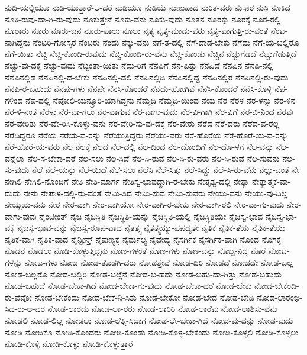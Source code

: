 {ನುಡಿ-ಯಲ್ಲಿಯೂ
ನುಡಿ-ಯುತ್ತಾರೆ-ಆ-ದರೆ
ನುಡಿಯೂ
ನುಡಿಯೆ
ನುಣುಪಾದ
ನುರಿತ-ವರು
ನುಸಾರ
ನುಸಿ
ನೂಕಿದ
ನೂಕಿ-ರುವು-ದಾ-ಗಿ-ರು-ವುದು
ನೂಕುತ್ತೇನೆ
ನೂಕು-ವನು
ನೂಕು-ವುದು
ನೂತನ
ನೂರಕ್ಕು
ನೂರಕ್ಕೆ
ನೂರ-ರಲ್ಲಿ
ನೂರಾರು
ನೂರು
ನೂರು-ಜನ
ನೂರು-ಪಾಲು
ನೂಲು
ನೃತ್ಯ
ನೃತ್ಯ-ಮಾಡು-ವರು
ನೃತ್ಯ-ವಾಗುತ್ತಿ-ರು-ವಂತೆ
ನೆಂಟ-ನಾಗಿದ್ದನು
ನೆಂಟರಿ-ಗೋಸ್ಕರ
ನೆಂಟರು
ನೆಂದು
ನೆಕ್ಕು-ವನು
ನೆಗೆ-ತ-ದಲ್ಲಿ
ನೆಗೆ-ದಾಡ-ಬೇಕು
ನೆಗೆದು
ನೆಗೆ-ಯ-ಬಲ್ಲಿರೊ
ನೆಗೆ-ಯಿತು
ನೆಚ್ಚಿ
ನೆಚ್ಚಿ-ಕೊಂಡಿ-ರುವುದು
ನೆಚ್ಚಿ-ಕೊಂಡಿ-ರು-ವೆನು
ನೆಚ್ಚಿ-ಕೊಂಡು
ನೆಚ್ಚಿನ
ನೆಚ್ಚುಗೆಡದೆ
ನೆಚ್ಚುಗೆಡುತ್ತಿದೆ
ನೆಚ್ಚು-ವು-ದಕ್ಕೆ
ನೆಚ್ಚು-ವುದು
ನೆಟ್ಟಂತಾ-ಯಿತು
ನೆದು-ರಿಗೆ
ನೆನಪಿಗೆ
ನೆನ-ಪಿತ್ತು
ನೆನಪಿದೆ
ನೆನಪಿನ
ನೆನಪಿ-ನಲ್ಲಿ
ನೆನಪಿನಲ್ಲಿಡ
ನೆನಪಿನಲ್ಲಿ-ಡ-ಬೇಕು
ನೆನಪಿನಲ್ಲಿ-ಡಲಿ
ನೆನಪಿನಲ್ಲಿಡಿ
ನೆನಪಿನಲ್ಲಿದ್ದ
ನೆನಪಿನಲ್ಲಿರ
ನೆನಪಿನಲ್ಲಿ-ರು-ವುದು
ನೆನಪಿ-ರ-ಬಹುದು
ನೆನಪು-ಗಳು
ನೆನಪೇ
ನೆನಸಿ-ಕೊಂಡರೆ
ನೆನೆದು-ಹೋಗಿವೆ
ನೆನೆಸಿ-ಕೊಂಡರೆ
ನೆನೆಸಿ-ಕೊಳ್ಳಿ
ನೆಪ-ಗಳಿಂದ
ನೆಪ-ದಲ್ಲಿ
ನೆಪೋಲಿ-ಯನ್ಕ್ರೂರಿ-ಯಾಗಿದ್ದನು
ನೆಮ್ಮದಿ
ನೆಮ್ಮದಿ-ಯಿಂದ
ನೆಯ
ನೆರ
ನೆರಳ
ನೆರ-ಳನ್ನು
ನೆರ-ಳಿನ
ನೆರ-ಳಿ-ನಂತೆ
ನೆರಳು
ನೆರ-ವಾ-ಗಲು
ನೆರ-ವಾಗುವ
ನೆರ-ವಾಗು-ವುದು
ನೆರ-ವಿ-ಗಾಗಿ
ನೆರ-ವಿಗೆ
ನೆರ-ವಿ-ನಿಂದ
ನೆರವು
ನೆರ-ವೇರಿತು
ನೆರ-ವೇ-ರಿಸಿ-ಕೊಳ್ಳು-ವನು
ನೆರ-ವೇರಿ-ಸು-ವು-ದಕ್ಕೆ
ನೆರ-ವೇರು
ನೆರೆದ
ನೆರೆ-ದರು
ನೆರೆದ-ವ-ರೆಲ್ಲ
ನೆರೆದಿದ್ದರೂ
ನೆರೆಯ
ನೆರೆಯ-ವ-ರನ್ನು
ನೆರೆಯುತ್ತಿದ್ದರು
ನೆರೆಯು-ವರು
ನೆರೆ-ಹೊರೆಯ
ನೆರೆ-ಹೊರೆ-ಯ-ವ-ರನ್ನು
ನೆರೆ-ಹೊರೆ-ಯ-ವರು
ನೆಲ
ನೆಲಕ್ಕೆ
ನೆಲದ
ನೆಲ-ದಲ್ಲಿ
ನೆಲ-ದಿಂದ
ನೆಲ-ದೊಂದಿಗೆ
ನೆಲ-ದೊ-ಳಗೆ
ನೆಲ-ವನ್ನು
ನೆಲ-ವನ್ನೆಲ್ಲಾ
ನೆಲ-ಸ-ಬೇಕಾ-ದರೆ
ನೆಲ-ಸಲು
ನೆಲ-ಸಿದೆ
ನೆಲ-ಸಿ-ರುವ
ನೆಲ-ಸಿ-ರು-ವರು
ನೆಲ-ಸಿ-ರುವೆ
ನೆಲ-ಸುವನು
ನೆಲ-ಸು-ವುದು
ನೆಲೆ
ನೆಲೆ-ಯನ್ನು
ನೆಲೆ-ಯಿದೆ
ನೆಲೆ-ಸಲು
ನೆಲೆಸಿ
ನೆಲೆ-ಸಿತ್ತು
ನೆಲೆ-ಸಿದ್ದು
ನೆಲೆ-ಸಿ-ರು-ವೆನು
ನೆಲ್ಸು-ವಂತೆ
ನೇ
ನೇಗಿಲಿ
ನೇಗಿಲಿ-ನೊಂದಿಗೆ
ನೇತಿ
ನೇತಿ-ಮಾರ್ಗ
ನೇತಿಸ್ವ-ಭಾವದ್ದಾಗಿ-ರ-ಬೇಕು
ನೇತೃತ್ವ-ದಲ್ಲಿ
ನೇತ್ಯಾ
ನೇತ್ಯಾತ್ಮಕ-ವಾ-ದುದು
ನೇನು
ನೇಪಾಳ-ದಲ್ಲಿ-ರು-ವಂತೆ
ನೇಮಿ-ಸಿದ
ನೇಮಿ-ಸುವ
ನೇಮಿ-ಸುವರು
ನೇಯು-ವನು
ನೇಯು-ವು-ದಿಲ್ಲ
ನೇಯ್ಗೆಯ-ವನು
ನೇರ
ನೇರ-ವಾಗಿ
ನೇರ-ವಾಗಿಯೋ
ನೇರ-ವಾಗಿ-ರ-ಬೇಕು
ನೇರ-ವಾಗಿ-ರಲಿ
ನೇರ-ವಾ-ಗು-ವುದು
ನೇರ-ವಾಗು-ವುವು
ನೈಂಟೀಂತ್
ನೈಜ
ನೈಜಸ್ಥಿತಿ
ನೈಜಸ್ಥಿತಿ-ಯನ್ನು
ನೈಜಸ್ಥಿತಿ-ಯಲ್ಲಿ
ನೈಜಸ್ಥಿತಿಯೇ
ನೈಜಸ್ವ-ಭಾವ
ನೈಜಸ್ವ-ಭಾ-ವಕ್ಕೆ
ನೈಜಸ್ವ-ಭಾವ-ವನ್ನು
ನೈಜಸ್ವ-ರೂಪ-ವಾದ
ನೈತತ್ತ್ವ
ನೈತತ್ತ್ವಯ್ಯು-ಪಪದ್ಯತೇ
ನೈತಿಕ
ನೈತಿಕ-ತೆಯ
ನೈತಿಕ-ತೆಯು
ನೈತಿಕ-ವಾಗಿ
ನೈತಿಕ-ವಾದ
ನೈನ್ಟೀನ್ತ್
ನೈಪುಣ್ಯಕ್ಕೆ
ನೈರ್ಮಲ್ಯ
ನೈವೇದ್ಯ
ನೈಸರ್ಗಿಕ
ನೈಸರ್ಗಿಕ-ವಾಗಿ
ನೊಂದ
ನೊಗಕ್ಕೆ
ನೊಡನೆ
ನೊಡಲು
ನೊಡಿ-ಕೊಳ್ಳುತ್ತಿದ್ದನು
ನೊಣ-ಗಳಂತೆ
ನೊಣ-ಗಳು
ನೊಣ-ವನ್ನು
ನೊಬ್ಬ-ನಿದ್ದ
ನೊರೆ
ನೋಟ-ಗಳನ್ನು
ನೋಟ-ಗಳು
ನೋಡ
ನೋಡ-ತೊಡಗಿ-ದರು
ನೋಡತ್ತೇವೆ
ನೋಡ-ದಿರಿ
ನೋಡದೆ
ನೋಡದೇ
ನೋಡ-ಬಲ್ಲ
ನೋಡ-ಬಲ್ಲರೊ
ನೋಡ-ಬಲ್ಲಿರಿ
ನೋಡ-ಬಲ್ಲೆನೆ
ನೋಡ-ಬ-ಹದು
ನೋಡ-ಬಹು-ದಾ-ಗಿತ್ತು
ನೋಡ-ಬಹುದು
ನೋಡ-ಬಹುದೆ
ನೋಡ-ಬೇಕಾ-ಗಿದೆ
ನೋಡ-ಬೇಕಾ-ಗು-ವುದು
ನೋಡ-ಬೇಕಾ-ದರೆ
ನೋಡ-ಬೇಕು
ನೋಡ-ಬೇಕೆಂದಿ-ರು-ವೆವೋ
ನೋಡ-ಬೇಕೆಂದು
ನೋಡ-ಬೇಕೆ-ನಿ-ಸಿತು
ನೋಡ-ಬೇಕೋ
ನೋಡ-ಬೇಡ
ನೋಡ-ಬೇಡಿ
ನೋಡ-ಲಾರಂಭಿ-ಸಿದ-ರು-ಅ-ವರ
ನೋಡ-ಲಾರದು
ನೋಡ-ಲಾ-ರರು
ನೋಡ-ಲಾರಿರಿ
ನೋಡ-ಲಾರೆವು
ನೋಡ-ಲಾಶಿಸು-ವೆನು
ನೋಡಲಿ
ನೋಡ-ಲಿಲ್ಲ
ನೋಡಲು
ನೋಡ-ಲೆತ್ನಿ-ಸಿದಾಗ
ನೋಡ-ಲೇ-ಬೇಕಾ-ಗಿದೆ
ನೋಡ-ವು-ದನ್ನು
ನೋಡ-ವುದು
ನೋಡಿ
ನೋಡಿಕೊ
ನೋಡಿ-ಕೊಂಡರು
ನೋಡಿ-ಕೊಂಡು
ನೋಡಿ-ಕೊಳ್ಳ-ಬೇಕೆಂದು
ನೋಡಿ-ಕೊಳ್ಳಲಿ
ನೋಡಿ-ಕೊಳ್ಳಲು
ನೋಡಿ-ಕೊಳ್ಳಿ
ನೋಡಿ-ಕೊಳ್ಳು
ನೋಡಿ-ಕೊಳ್ಳುತ್ತಾರೆ
}
